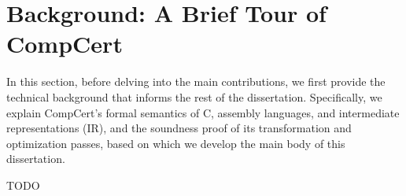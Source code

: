 \section{Background: A Brief Tour of CompCert}
\label{sec:background}

In this section, before delving into the main contributions, we first provide the technical
background that informs the rest of the dissertation.  Specifically, we explain CompCert's formal
semantics of C, assembly languages, and intermediate representations (IR), and the soundness proof
of its transformation and optimization passes, based on which we develop the main body of this
dissertation.

TODO


